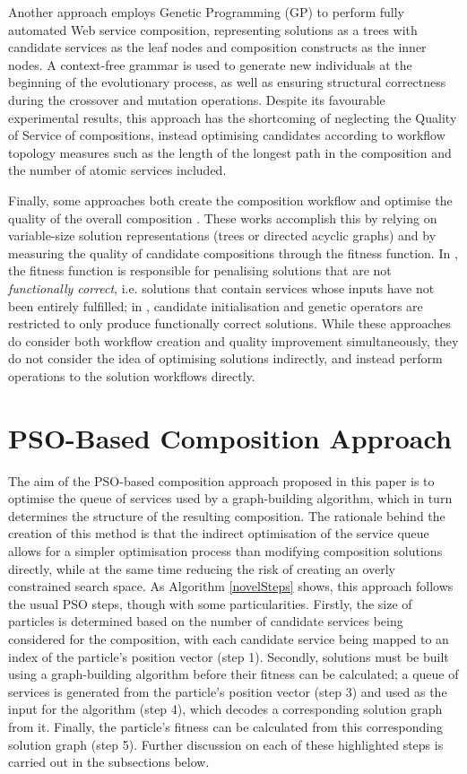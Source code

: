 \documentclass{llncs}
\begin{document}
Another approach \cite{rodriguez2010composition} employs Genetic Programming (GP) to perform fully automated Web service composition, representing solutions as a trees with candidate services as the leaf nodes and composition constructs as the inner nodes. A context-free grammar is used to generate new individuals at the beginning of the evolutionary process, as well as ensuring structural correctness during the crossover and mutation operations. Despite its favourable experimental results, this approach has the shortcoming of neglecting the Quality of Service of compositions, instead optimising candidates according to workflow topology measures such as the length of the longest path in the composition and the number of atomic services included.

Finally, some approaches both create the composition workflow and optimise the quality of the overall composition \cite{yu2013adaptive,da2015graphevol}. These works accomplish this by relying on variable-size solution representations (trees or directed acyclic graphs) and by measuring the quality of candidate compositions through the fitness function. In \cite{yu2013adaptive}, the fitness function is responsible for penalising solutions that are not \textit{functionally correct}, i.e. solutions that contain services whose inputs have not been entirely fulfilled; in \cite{da2015graphevol}, candidate initialisation and genetic operators are restricted to only produce functionally correct solutions. While these approaches do consider both workflow creation and quality improvement simultaneously, they do not consider the idea of optimising solutions indirectly, and instead perform operations to the solution workflows directly. 

\section{PSO-Based Composition Approach}\label{pso_approach}
The aim of the PSO-based composition approach proposed in this paper is to optimise the queue of services used by a graph-building algorithm, which in turn determines the structure of the resulting composition. The rationale behind the creation of this method is that the indirect optimisation of the service queue allows for a simpler optimisation process than modifying composition solutions directly, while at the same time reducing the risk of creating an overly constrained search space. As Algorithm \ref{novelSteps} shows, this approach follows the usual PSO steps, though with some particularities. Firstly, the size of particles is determined based on the number of candidate services being considered for the composition, with each candidate service being mapped to an index of the particle's position vector (step 1). Secondly, solutions must be built using a graph-building algorithm before their fitness can be calculated; a queue of services is generated from the particle's position vector (step 3) and used as the input for the algorithm (step 4), which decodes a corresponding solution graph from it. Finally, the particle's fitness can be calculated from this corresponding solution graph (step 5). Further discussion on each of these highlighted steps is carried out in the subsections below.
\end{document}
